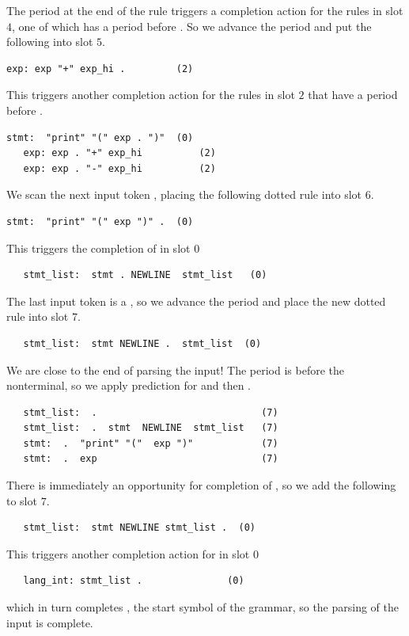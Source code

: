 \documentclass[7x10]{TimesAPriori_MIT}%
\numberwithin{theorem}{chapter}
\numberwithin{definition}{chapter}
\numberwithin{equation}{chapter}
\begin{document}
{The period at the end of the rule triggers a completion action for the
rules in slot $4$, one of which has a period before .
So we advance the period and put the following into slot $5$.
\begin{lstlisting}[escapechar=$]
   exp: exp "+" exp_hi .         (2)
\end{lstlisting}
This triggers another completion action for the rules in slot $2$ that
have a period before .
\begin{lstlisting}[escapechar=$]
   stmt:  "print" "(" exp . ")"  (0)
   exp: exp . "+" exp_hi          (2)
   exp: exp . "-" exp_hi          (2)
\end{lstlisting}

We scan the next input token , placing the following dotted
rule into slot $6$.
\begin{lstlisting}[escapechar=$]
   stmt:  "print" "(" exp ")" .  (0)
\end{lstlisting}
This triggers the completion of  in slot $0$
\begin{lstlisting}
   stmt_list:  stmt . NEWLINE  stmt_list   (0)
\end{lstlisting}
The last input token is a , so we advance the period
and place the new dotted rule into slot $7$.
\begin{lstlisting}
   stmt_list:  stmt NEWLINE .  stmt_list  (0)
\end{lstlisting}
We are close to the end of parsing the input!
The period is before the  nonterminal, so we
apply prediction for  and then .
\begin{lstlisting}
   stmt_list:  .                             (7)
   stmt_list:  .  stmt  NEWLINE  stmt_list   (7)
   stmt:  .  "print" "("  exp ")"            (7)
   stmt:  .  exp                             (7)
\end{lstlisting}
There is immediately an opportunity for completion of ,
so we add the following to slot $7$.
\begin{lstlisting}
   stmt_list:  stmt NEWLINE stmt_list .  (0)
\end{lstlisting}
This triggers another completion action for  in slot $0$
\begin{lstlisting}
   lang_int: stmt_list .               (0)
\end{lstlisting}
which in turn completes , the start symbol of the
grammar, so the parsing of the input is complete.

}
\end{document}

